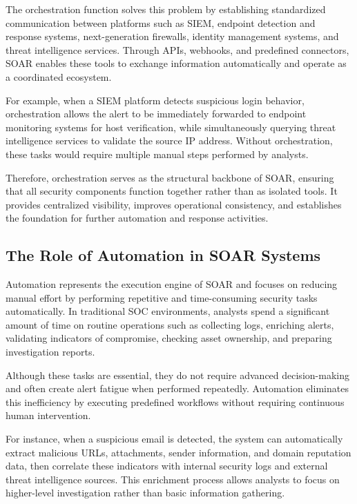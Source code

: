\documentclass[12pt]{report}
\begin{document}
The orchestration function solves this problem by establishing standardized communication between platforms such as SIEM, endpoint detection and response systems, next-generation firewalls, identity management systems, and threat intelligence services. Through APIs, webhooks, and predefined connectors, SOAR enables these tools to exchange information automatically and operate as a coordinated ecosystem.

For example, when a SIEM platform detects suspicious login behavior, orchestration allows the alert to be immediately forwarded to endpoint monitoring systems for host verification, while simultaneously querying threat intelligence services to validate the source IP address. Without orchestration, these tasks would require multiple manual steps performed by analysts.

Therefore, orchestration serves as the structural backbone of SOAR, ensuring that all security components function together rather than as isolated tools. It provides centralized visibility, improves operational consistency, and establishes the foundation for further automation and response activities.

\subsection{The Role of Automation in SOAR Systems}

Automation represents the execution engine of SOAR and focuses on reducing manual effort by performing repetitive and time-consuming security tasks automatically. In traditional SOC environments, analysts spend a significant amount of time on routine operations such as collecting logs, enriching alerts, validating indicators of compromise, checking asset ownership, and preparing investigation reports.

Although these tasks are essential, they do not require advanced decision-making and often create alert fatigue when performed repeatedly. Automation eliminates this inefficiency by executing predefined workflows without requiring continuous human intervention.

For instance, when a suspicious email is detected, the system can automatically extract malicious URLs, attachments, sender information, and domain reputation data, then correlate these indicators with internal security logs and external threat intelligence sources. This enrichment process allows analysts to focus on higher-level investigation rather than basic information gathering.
\end{document}
